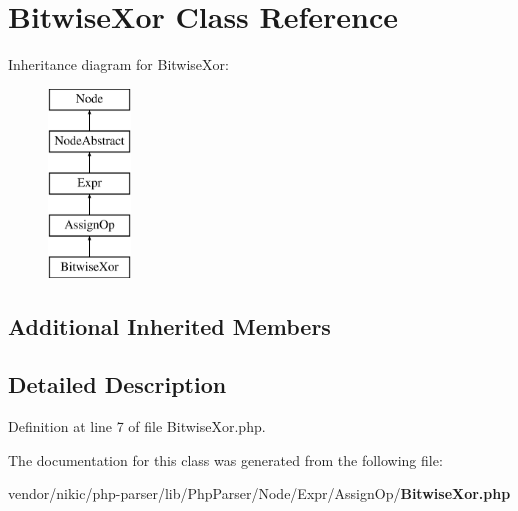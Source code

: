 \section{Bitwise\+Xor Class Reference}
\label{class_php_parser_1_1_node_1_1_expr_1_1_assign_op_1_1_bitwise_xor}
Inheritance diagram for Bitwise\+Xor\+:\begin{figure}[H]
\begin{center}
\leavevmode
\includegraphics[height=5.000000cm]{class_php_parser_1_1_node_1_1_expr_1_1_assign_op_1_1_bitwise_xor}
\end{center}
\end{figure}
\subsection*{Additional Inherited Members}


\subsection{Detailed Description}


Definition at line 7 of file Bitwise\+Xor.\+php.



The documentation for this class was generated from the following file\+:\begin{DoxyCompactItemize}
\item 
vendor/nikic/php-\/parser/lib/\+Php\+Parser/\+Node/\+Expr/\+Assign\+Op/{\bf Bitwise\+Xor.\+php}\end{DoxyCompactItemize}
